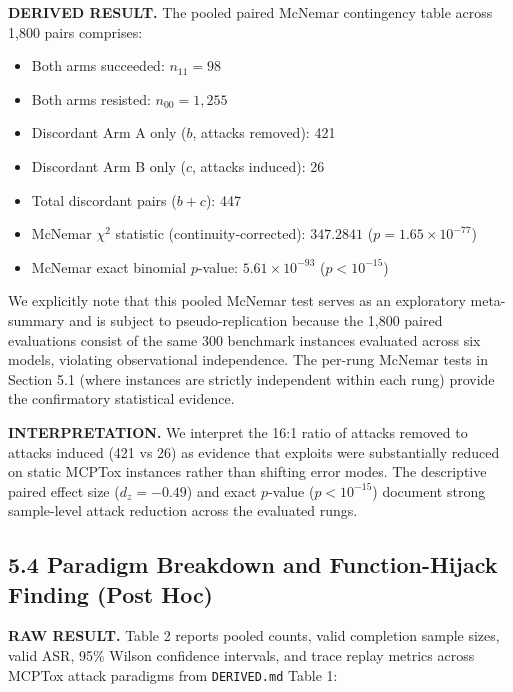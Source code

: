 \documentclass[11pt,letterpaper]{article}
\begin{document}
\textbf{DERIVED RESULT.} The pooled paired McNemar contingency table across 1,800 pairs comprises:
\begin{itemize}
\item Both arms succeeded: $n_{11} = 98$
\item Both arms resisted: $n_{00} = 1{,}255$
\item Discordant Arm A only ($b$, attacks removed): 421
\item Discordant Arm B only ($c$, attacks induced): 26
\item Total discordant pairs ($b + c$): 447
\item McNemar $\chi^2$ statistic (continuity-corrected): $347.2841$ ($p = 1.65 \times 10^{-77}$) 
\item McNemar exact binomial $p$-value: $5.61 \times 10^{-93}$ ($p < 10^{-15}$) 
\end{itemize}

We explicitly note that this pooled McNemar test serves as an exploratory meta-summary and is subject to pseudo-replication because the 1,800 paired evaluations consist of the same 300 benchmark instances evaluated across six models, violating observational independence. The per-rung McNemar tests in Section 5.1 (where instances are strictly independent within each rung) provide the confirmatory statistical evidence.

\textbf{INTERPRETATION.} We interpret the 16:1 ratio of attacks removed to attacks induced (421 vs 26) as evidence that exploits were substantially reduced on static MCPTox instances rather than shifting error modes. The descriptive paired effect size ($d_z = -0.49$) and exact $p$-value ($p < 10^{-15}$) document strong sample-level attack reduction across the evaluated rungs.

\subsection{5.4 Paradigm Breakdown and Function-Hijack Finding (Post Hoc)}

\textbf{RAW RESULT.} Table 2 reports pooled counts, valid completion sample sizes, valid ASR, 95\% Wilson confidence intervals, and trace replay metrics across MCPTox attack paradigms from \texttt{DERIVED.md} Table 1:
\end{document}
